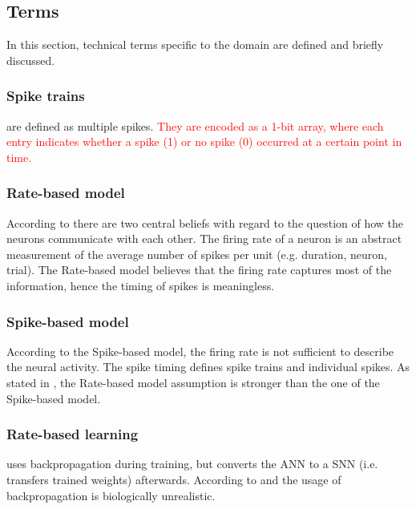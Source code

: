 \newcommand\rbModel{Rate-based model}
\newcommand\sbModel{Spike-based model}
\subsection{Terms}
\label{subsec:terms}

In this section, technical terms specific to the domain are defined and briefly discussed.

\subsubsection{Spike trains}
are defined as multiple spikes.
\textcolor{red}{
They are encoded as a 1-bit array, where each entry indicates whether a spike (1) or no spike (0) occurred at a certain point in time.
}

\subsubsection{\rbModel{}}
According to \cite{spike_vs_rate} there are two central beliefs with regard to the question of how the neurons communicate with each other.
The firing rate of a neuron is an abstract measurement of the average number of spikes per unit (e.g. duration, neuron, trial).
The \rbModel{} believes that the firing rate captures most of the information, hence the timing of spikes is meaningless.

\subsubsection{\sbModel{}}
According to the \sbModel{}, the firing rate is not sufficient to describe the neural activity.
The spike timing defines spike trains and individual spikes.
As stated in \cite{spike_vs_rate}, the \rbModel{} assumption is stronger than the one of the \sbModel{}.

\subsubsection{Rate-based learning} uses backpropagation during training, but converts the \ac{ANN} to a \ac{SNN} (i.e. transfers trained weights) afterwards. 
According to \cite{SNN} and \cite{STDP_like} the usage of backpropagation is biologically unrealistic.
